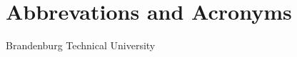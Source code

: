 %
%
%
%
\cleardoublepage
\chapter*{Abbrevations and Acronyms}

\begin{acronym}[AAAAAAA]	
	
	\setlength{\itemsep}{.7\parsep}
	
	 {Brandenburg Technical University}
\end{acronym}
